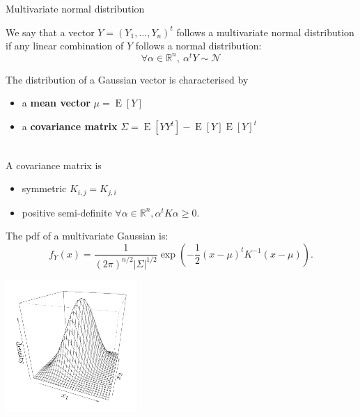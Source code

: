 \documentclass{beamer}
\DeclareMathOperator*{\E}{E}
\DeclareMathOperator*{\Cov}{cov}
\begin{document}
\begin{frame}{Multivariate normal distribution}
\begin{definition}
	We say that a vector $Y=(Y_1, \dots, Y_n)^t$ follows a multivariate normal distribution if any linear combination of $Y$ follows a normal distribution:
	\begin{equation*}
		\forall \alpha \in \mathds{R}^n,\ \alpha^t Y \sim \mathcal{N}
	\end{equation*}
\end{definition}
The distribution of a Gaussian vector is characterised by
\begin{itemize}
 	\item a \textbf{mean vector} $\mu = \E [Y]$
 	\item a \textbf{covariance matrix} $\Sigma = \E[YY^t] - \E[Y] \E[Y]^t$ %
\end{itemize}
\vspace{3mm}
\\
A covariance matrix is
\begin{itemize}
	\item symmetric $K_{i,j}=K_{j,i}$
	\item positive semi-definite $\forall \alpha \in \mathds{R}^n, \alpha^t K \alpha \geq 0$.
\end{itemize}
\end{frame}

\begin{frame}{}
The pdf of a multivariate Gaussian is:
\begin{equation*}
f_Y(x) = \frac{1}{\displaystyle (2 \pi)^{n/2} |\Sigma|^{1/2}} \exp \left(-\frac12 (x-\mu)^t K^{-1} (x-\mu)  \right).
\end{equation*}
\begin{center}
 \includegraphics[height=5cm]{figures/R/MVN_dens2}
\end{center}
\end{frame}
\end{document}
